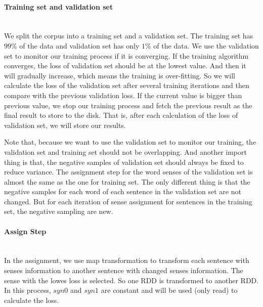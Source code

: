 \paragraph{Training set and validation set} \ \\
We split the corpus into a training set and a validation set. The training set has $99\%$ of the data and validation set has only $1\%$ of the data. We use the validation set to monitor our training process if it is converging. If the training algorithm  converges, the loss of validation set should be at the lowest value. And then it will gradually increase, which means the training is over-fitting. So we will calculate the loss of the validation set after several training iterations and then compare with the previous validation loss. If the current value is bigger than previous value, we stop our training process and fetch the previous result as the final result to store to the disk. That is, after each calculation of the loss of validation set, we will store our results. 

Note that, because we want to use the validation set to monitor our training, the validation set and training set should not be overlapping. And another import thing is that, the negative samples of validation set should always be fixed to reduce variance.  The assignment step for the word senses of the validation set is almost the same as the one for training set. The only different thing is that the negative samples for each word of each sentence in the validation set are not changed. But for each iteration of sense assignment for sentences in the training set, the negative sampling are new. 

\paragraph{Assign Step}\ \\
In the assignment, we use map transformation to transform each sentence with senses information to another sentence with changed senses information. The sense with the lowes loss is selected. So one RDD is transformed to another RDD. In this process, $syn0$ and $syn1$ are constant and will be used (only read) to calculate the loss. 

